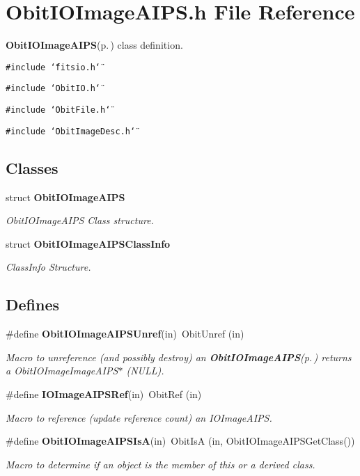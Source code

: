 \section{Obit\-IOImage\-AIPS.h File Reference}
\label{ObitIOImageAIPS_8h}
{\bf Obit\-IOImage\-AIPS}{\rm (p.\,\pageref{structObitIOImageAIPS})} class definition. 

{\tt \#include \char`\"{}fitsio.h\char`\"{}}\par
{\tt \#include \char`\"{}Obit\-IO.h\char`\"{}}\par
{\tt \#include \char`\"{}Obit\-File.h\char`\"{}}\par
{\tt \#include \char`\"{}Obit\-Image\-Desc.h\char`\"{}}\par
\subsection*{Classes}
\begin{CompactItemize}
\item 
struct {\bf Obit\-IOImage\-AIPS}
\begin{CompactList}\small\item\em Obit\-IOImage\-AIPS Class structure. \item\end{CompactList}\item 
struct {\bf Obit\-IOImage\-AIPSClass\-Info}
\begin{CompactList}\small\item\em Class\-Info Structure. \item\end{CompactList}\end{CompactItemize}
\subsection*{Defines}
\begin{CompactItemize}
\item 
\#define {\bf Obit\-IOImage\-AIPSUnref}(in)\ Obit\-Unref (in)
\begin{CompactList}\small\item\em Macro to unreference (and possibly destroy) an {\bf Obit\-IOImage\-AIPS}{\rm (p.\,\pageref{structObitIOImageAIPS})} returns a Obit\-IOImage\-Image\-AIPS$\ast$ (NULL). \item\end{CompactList}\item 
\#define {\bf IOImage\-AIPSRef}(in)\ Obit\-Ref (in)
\begin{CompactList}\small\item\em Macro to reference (update reference count) an IOImage\-AIPS. \item\end{CompactList}\item 
\#define {\bf Obit\-IOImage\-AIPSIs\-A}(in)\ Obit\-Is\-A (in, Obit\-IOImage\-AIPSGet\-Class())
\begin{CompactList}\small\item\em Macro to determine if an object is the member of this or a derived class. \item\end{CompactList}\end{CompactItemize}
